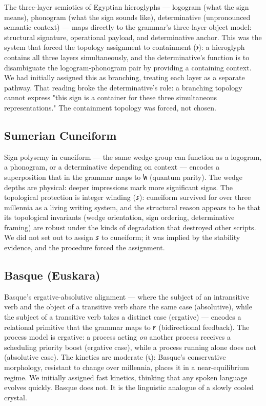 \documentclass[12pt,a4paper]{article}
\begin{document}
The three-layer semiotics of Egyptian hieroglyphs --- logogram (what the sign means), phonogram (what the sign sounds like), determinative (unpronounced semantic context) --- maps directly to the grammar's three-layer object model: structural signature, operational payload, and determinative anchor. This was the system that forced the topology assignment to containment ($\text{𐑶}$): a hieroglyph contains all three layers simultaneously, and the determinative's function is to disambiguate the logogram-phonogram pair by providing a containing context. We had initially assigned this as branching, treating each layer as a separate pathway. That reading broke the determinative's role: a branching topology cannot express "this sign is a container for these three simultaneous representations." The containment topology was forced, not chosen.

\subsection{Sumerian Cuneiform}

Sign polysemy in cuneiform --- the same wedge-group can function as a logogram, a phonogram, or a determinative depending on context --- encodes a superposition that in the grammar maps to $\text{𐑿}$ (quantum parity). The wedge depths are physical: deeper impressions mark more significant signs. The topological protection is integer winding ($\text{𐑭}$): cuneiform survived for over three millennia as a living writing system, and the structural reason appears to be that its topological invariants (wedge orientation, sign ordering, determinative framing) are robust under the kinds of degradation that destroyed other scripts. We did not set out to assign $\text{𐑭}$ to cuneiform; it was implied by the stability evidence, and the procedure forced the assignment.

\subsection{Basque (Euskara)}

Basque's ergative-absolutive alignment --- where the subject of an intransitive verb and the object of a transitive verb share the same case (absolutive), while the subject of a transitive verb takes a distinct case (ergative) --- encodes a relational primitive that the grammar maps to $\text{𐑾}$ (bidirectional feedback). The process model is ergative: a process acting \emph{on} another process receives a scheduling priority boost (ergative case), while a process running alone does not (absolutive case). The kinetics are moderate ($\text{𐑧}$): Basque's conservative morphology, resistant to change over millennia, places it in a near-equilibrium regime. We initially assigned fast kinetics, thinking that any spoken language evolves quickly. Basque does not. It is the linguistic analogue of a slowly cooled crystal.
\end{document}
